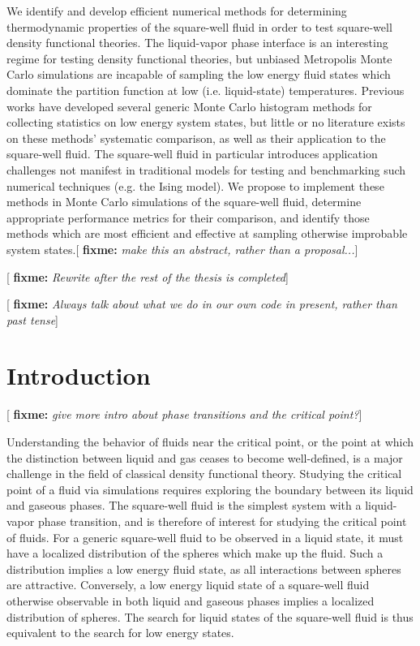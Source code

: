 \documentclass[11pt]{article}
\newcommand{\red}[1]{{\bf \color{red} #1}}
\newcommand{\fixme}[1]{[\red{fixme:} \emph{#1}]}
\begin{document}
\thispagestyle{abstract}

We identify and develop efficient numerical methods for determining
thermodynamic properties of the square-well fluid in order to test
square-well density functional theories. The liquid-vapor phase
interface is an interesting regime for testing density functional
theories, but unbiased Metropolis Monte Carlo simulations are
incapable of sampling the low energy fluid states which dominate the
partition function at low (i.e. liquid-state) temperatures. Previous
works have developed several generic Monte Carlo histogram methods for
collecting statistics on low energy system states, but little or no
literature exists on these methods' systematic comparison, as well as
their application to the square-well fluid. The square-well fluid in
particular introduces application challenges not manifest in
traditional models for testing and benchmarking such numerical
techniques (e.g. the Ising model). We propose to implement these
methods in Monte Carlo simulations of the square-well fluid, determine
appropriate performance metrics for their comparison, and identify
those methods which are most efficient and effective at sampling
otherwise improbable system states.\fixme{make this an abstract,
  rather than a proposal...}

\fixme{Rewrite after the rest of the thesis is completed}

\fixme{Always talk about what we do in our own code in present, rather
  than past tense}


\newpage


\section{Introduction}
\label{sec:intro}

\fixme{give more intro about phase transitions and the critical
  point?}

Understanding the behavior of fluids near the critical point, or the
point at which the distinction between liquid and gas ceases to become
well-defined, is a major challenge in the field of classical density
functional theory. Studying the critical point of a fluid via
simulations requires exploring the boundary between its liquid and
gaseous phases. The square-well fluid is the simplest system with a
liquid-vapor phase transition, and is therefore of interest for
studying the critical point of fluids. For a generic square-well fluid
to be observed in a liquid state, it must have a localized
distribution of the spheres which make up the fluid. Such a
distribution implies a low energy fluid state, as all interactions
between spheres are attractive. Conversely, a low energy liquid state
of a square-well fluid otherwise observable in both liquid and gaseous
phases implies a localized distribution of spheres. The search for
liquid states of the square-well fluid is thus equivalent to the
search for low energy states.
\end{document}
